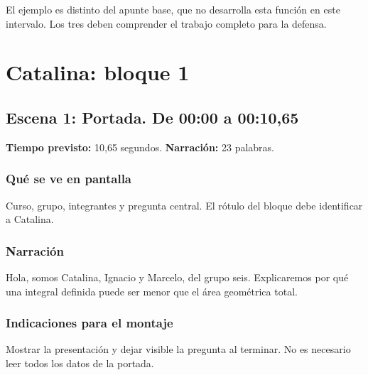 \documentclass[11pt,a4paper]{article}
\newcommand{\escena}[4]{\textbf{Escena #1: #2.} De #3 a #4}
\begin{document}
El ejemplo es distinto del apunte base, que no desarrolla esta función en este intervalo. Los tres deben comprender el trabajo completo para la defensa.

\clearpage
\section*{Catalina: bloque 1}

\noindent\begin{minipage}[t]{\textwidth}
\subsection*{\escena{1}{Portada}{00:00}{00:10,65}}

\textbf{Tiempo previsto:} 10,65 segundos. \textbf{Narración:} 23 palabras.

\subsubsection*{Qué se ve en pantalla}
Curso, grupo, integrantes y pregunta central. El rótulo del bloque debe identificar a Catalina.

\subsubsection*{Narración}
Hola, somos Catalina, Ignacio y Marcelo, del grupo seis. Explicaremos por qué una integral definida puede ser menor que el área geométrica total.

\subsubsection*{Indicaciones para el montaje}
Mostrar la presentación y dejar visible la pregunta al terminar. No es necesario leer todos los datos de la portada.
\end{minipage}\par\medskip
\end{document}
